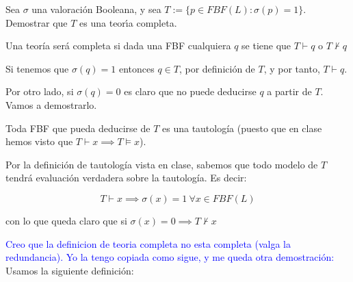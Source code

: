 \begin{problem}[3]
Sea $\sigma$ una valoraci\'on Booleana, y sea $T :=\{p\in FBF(L) : \sigma(p) = 1\}$.
Demostrar que $T$ es una teor\'{\i}a completa.
\solution

Una teoría será completa si dada una FBF cualquiera $q$ se tiene que $T \vdash q$ o $T \nvdash q$

Si tenemos que $σ(q)=1$ entonces $q \in T$, por definición de $T$, y por tanto, $T \vdash q$.

Por otro lado, si $σ(q)=0$ es claro que no puede deducirse $q$ a partir de $T$. Vamos a demostrarlo.

Toda FBF que pueda deducirse de $T$ es una tautología (puesto que en clase hemos visto que $T \vdash x \implies T \vDash x$).

Por la definición de tautología vista en clase, sabemos que todo modelo de $T$ tendrá evaluación verdadera sobre la tautología. Es decir:

\[T \vdash x \implies σ(x) = 1 \ \forall x\in FBF(L)\]

con lo que queda claro que si $σ(x)=0 \implies T \nvdash x$
\end{problem}


\textcolor{blue} {Creo que la definicion de teoria completa no esta completa (valga la redundancia). Yo la tengo copiada como sigue, y me queda otra demostración:}\newline
Usamos la siguiente definición:

